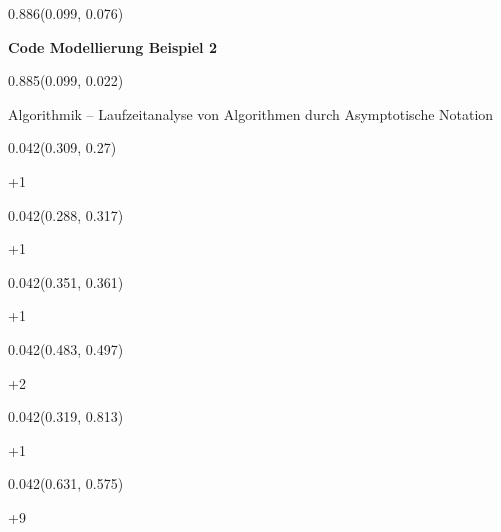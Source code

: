 \documentclass[aspectratio=169]{beamer}
\begin{document}
\begin{frame}[fragile]
\begin{textblock}{0.886}(0.099, 0.076)
  \begin{minipage}[t][0.131\paperheight]{\linewidth}
    \textbf{Code Modellierung Beispiel 2}
  \end{minipage}
\end{textblock}
\begin{textblock}{0.885}(0.099, 0.022)
  \begin{minipage}[b][0.031\paperheight]{\linewidth}
    \raggedright
    \fontsize{3}{3.3}\selectfont Algorithmik – Laufzeitanalyse von Algorithmen durch Asymptotische Notation
  \end{minipage}
\end{textblock}
\begin{textblock}{0.042}(0.309, 0.27)
  \begin{minipage}[t][0.044\paperheight]{\linewidth}
    {\tiny +1}
  \end{minipage}
\end{textblock}
\begin{textblock}{0.042}(0.288, 0.317)
  \begin{minipage}[t][0.044\paperheight]{\linewidth}
    {\tiny +1}
  \end{minipage}
\end{textblock}
\begin{textblock}{0.042}(0.351, 0.361)
  \begin{minipage}[t][0.044\paperheight]{\linewidth}
    {\tiny +1}
  \end{minipage}
\end{textblock}
\begin{textblock}{0.042}(0.483, 0.497)
  \begin{minipage}[t][0.044\paperheight]{\linewidth}
    {\tiny +2}
  \end{minipage}
\end{textblock}
\begin{textblock}{0.042}(0.319, 0.813)
  \begin{minipage}[t][0.044\paperheight]{\linewidth}
    {\tiny +1}
  \end{minipage}
\end{textblock}
\begin{textblock}{0.042}(0.631, 0.575)
  \begin{minipage}[t][0.044\paperheight]{\linewidth}
    {\tiny +9}
  \end{minipage}
\end{textblock}

\end{frame}
\end{document}
